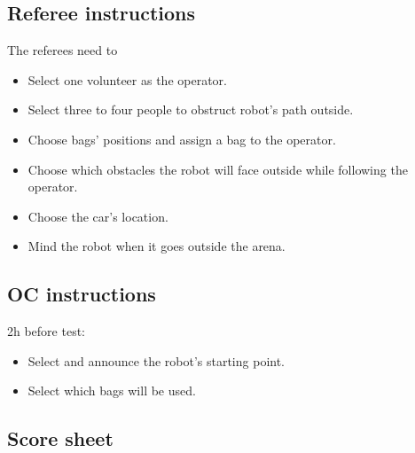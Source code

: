 \subsection{Referee instructions}

The referees need to
\begin{itemize}[nosep]
	\item Select one volunteer as the operator.
	\item Select three to four people to obstruct robot's path outside.
	\item Choose bags' positions and assign a bag to the operator.
	\item Choose which obstacles the robot will face outside while following the operator.
	\item Choose the car's location.
	\item Mind the robot when it goes outside the arena.
\end{itemize}

\subsection{OC instructions}

2h before test:
\begin{itemize}[nosep]
	\item Select and announce the robot's starting point.
	\item Select which bags will be used.
\end{itemize}

\subsection{Score sheet}

